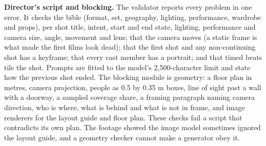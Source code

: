 \documentclass[11pt,a4paper]{article}
\begin{document}
\textbf{Director's script and blocking.} The validator reports every problem in one error. It checks the bible (format, set, geography, lighting, performance, wardrobe and props), per shot title, intent, start and end state, lighting, performance and camera size, angle, movement and lens; that the camera moves (a static frame is what made the first films look dead); that the first shot and any non-continuing shot has a keyframe; that every cast member has a portrait; and that timed beats tile the shot. Prompts are fitted to the model's 2,500-character limit and state how the previous shot ended. The blocking module is geometry: a floor plan in metres, camera projection, people as 0.5 by 0.35 m boxes, line of sight past a wall with a doorway, a sampled coverage share, a framing paragraph naming camera direction, who is where, what is behind and what is not in frame, and image renderers for the layout guide and floor plan. These checks fail a script that contradicts its own plan. The footage showed the image model sometimes ignored the layout guide, and a geometry checker cannot make a generator obey it.
\end{document}
